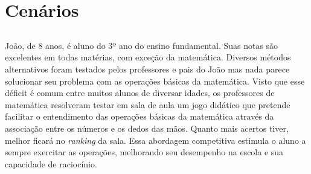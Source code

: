 \documentclass[
    12pt,               %
    openany,          	%
    twoside,            %
    a4paper,            %
    brazil              %
    ]{abntex2}
\begin{document}
\chapter{Cenários}

\section{} 
João, de 8 anos, é aluno do 3º ano do ensino fundamental. Suas notas são
excelentes em todas matérias, com exceção da matemática. Diversos métodos
alternativos foram testados pelos professores e pais do João mas nada parece
solucionar seu problema com as operações básicas da matemática. Visto que esse
déficit é comum entre muitos alunos de diversar idades, os professores de
matemática resolveram testar em sala de aula um jogo didático que pretende
facilitar o entendimento das operações básicas da matemática através da
associação entre os números e os dedos das mãos. Quanto mais acertos tiver,
melhor ficará no \textit{ranking} da sala. Essa abordagem competitiva estimula
o aluno a sempre exercitar as operações, melhorando seu desempenho na escola e
sua capacidade de raciocínio.
\end{document}
